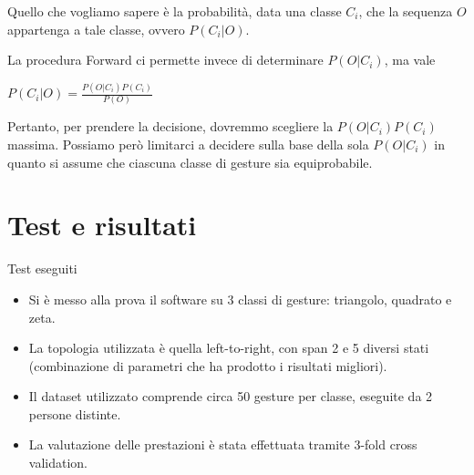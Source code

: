 \documentclass[slidestop,mathserif,red]{beamer}
\begin{document}
\begin{frame}
\begin{block}{}
 Quello che vogliamo sapere \`e la probabilit\`a, data una classe $C_{i}$, che la sequenza $O$ appartenga a tale classe, ovvero $P(C_{i}|O)$.
\end{block}
\begin{block}{}
 La procedura Forward ci permette invece di determinare $P(O|C_{i})$, ma vale
\begin{center}$P(C_{i}|O) = \frac{P(O|C_{i})P(C_{i})}{P(O)}$\end{center}
\end{block}
\begin{block}{}
 Pertanto, per prendere la decisione, dovremmo scegliere la $P(O|C_{i})P(C_{i})$ massima. Possiamo per\`o limitarci a decidere sulla base della sola $P(O|C_{i})$ in quanto si assume che ciascuna classe di gesture sia equiprobabile.
\end{block}
\end{frame}

\section{Test e risultati}

\begin{frame}{Test eseguiti}
\begin{block}{}
\begin{itemize}
\item Si \`e messo alla prova il software su 3 classi di gesture: triangolo, quadrato e zeta.
\item La topologia utilizzata \`e quella left-to-right, con span 2 e 5 diversi stati (combinazione di parametri che ha prodotto i risultati migliori).
\item Il dataset utilizzato comprende circa 50 gesture per classe, eseguite da 2 persone distinte.
\item La valutazione delle prestazioni \`e stata effettuata tramite 3-fold cross validation.
\end{itemize}

\end{block}
\end{frame}
\end{document}

